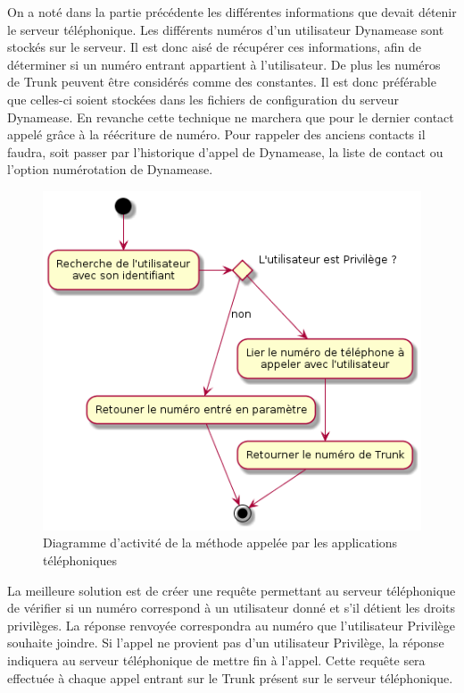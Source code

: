 On a noté dans la partie précédente les différentes informations que devait détenir le serveur téléphonique. Les différents numéros d'un utilisateur Dynamease sont stockés sur le serveur. Il est donc aisé de récupérer ces informations, afin de déterminer si un numéro entrant appartient à l'utilisateur. De plus les numéros de Trunk peuvent être considérés comme des constantes. Il est donc préférable que celles-ci soient stockées dans les fichiers de configuration du serveur Dynamease. En revanche cette technique ne marchera que pour le dernier contact appelé grâce à la réécriture de numéro. Pour rappeler des anciens contacts il faudra, soit passer par l'historique d'appel de Dynamease, la liste de contact ou l'option numérotation de Dynamease.
\newpage
\begin{figure}[!h]
	\centering
	\includegraphics[scale=0.7]{img/activity_rewrite_app.png}
	\caption{\label{activity_rewrite_app} Diagramme d'activité de la méthode appelée par les applications téléphoniques}
\end{figure}

La meilleure solution est de créer une requête permettant au serveur téléphonique de vérifier si un numéro correspond à un utilisateur donné et s'il détient les droits privilèges. La réponse renvoyée correspondra au numéro que l'utilisateur Privilège souhaite joindre. Si l'appel ne provient pas d'un utilisateur Privilège, la réponse indiquera au serveur téléphonique de mettre fin à l'appel. Cette requête sera effectuée à chaque appel entrant sur le Trunk présent sur le serveur téléphonique.

